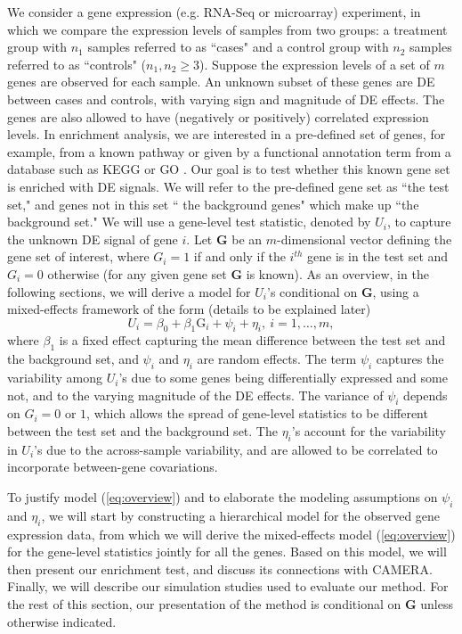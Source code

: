 	We consider a gene expression (e.g. RNA-Seq or microarray) experiment, in which we compare the 
	expression levels of samples from two groups: a treatment group with $n_1$ samples referred to 
	as ``cases" and a control group with $n_2$ samples referred to as ``controls" ($n_1,n_2\ge 3$). 
	Suppose the expression levels of a set of $m$ genes are observed for each sample. An unknown 
	subset of these genes are DE between cases and controls, with varying sign and magnitude of DE 
	effects. The genes are also allowed to have (negatively or positively) correlated expression 
	levels. In enrichment analysis, we are interested in a pre-defined set of genes, for example, 
	from a known pathway or given by a functional annotation term from a database such as KEGG
	\citep{kanehisa2000kegg} or GO \citep{ashburner2000gene}. Our goal is to test whether this known
	gene set is enriched with DE signals. We will refer to the pre-defined gene set as ``the test 
	set," and genes not in this set `` the background genes" which make up ``the background set."
	 We will use a gene-level test statistic, denoted by $U_i$, to capture the unknown DE signal of 
	 gene $i$. Let $\bm G$ be an $m$-dimensional vector defining the gene set of interest, where 
	 $G_i=1$ if and only if the $i^{th}$ gene is in the test set and $G_i=0$ otherwise (for any 
	 given gene set $\bm G$ is known). As an overview, in the 
	following sections, we will derive a model for $ U_i$'s conditional on 
	$\bm G$, using a mixed-effects framework of the form (details to be explained later)
		\begin{equation}\label{eq:overview}
		U_i = \beta_0 + \beta_1\text{G}_i  + \psi_i  + \eta_i, ~i = 1, \ldots, m,  
		\end{equation}
	where $\beta_1$ is a fixed effect capturing the mean difference between the test set and the 
	background set, and $\psi_i$ and $\eta_i$ are random effects. The term $\psi_i$ captures the 
	variability among $U_i$'s due to some genes being differentially expressed and some not, and to 
	the varying magnitude of the DE effects.
	 The variance of $\psi_i$ depends on $G_i=0$ or $1$, which allows the spread of gene-level 
	 statistics to be different between the test set and the background set. The $\eta_i$'s account 
	 for the variability in $U_i$'s due to the across-sample variability, and are allowed to be 
	 correlated to incorporate between-gene covariations.
		
	 To justify model (\ref{eq:overview}) and to elaborate the modeling 
	 assumptions on $\psi_i$ 
	 and $\eta_i$, we will start by constructing a hierarchical model for the observed gene 
	 expression data, from which we will derive the mixed-effects model (\ref{eq:overview}) for the 
	 gene-level statistics jointly for all the genes. Based on this model, we will then present our 
	 enrichment test, and 
	discuss its connections with CAMERA. Finally, we will describe our simulation studies used to 
	evaluate our method. For the rest of this section, our presentation of the method is 
	conditional on $\bm G$ unless otherwise indicated.
	
